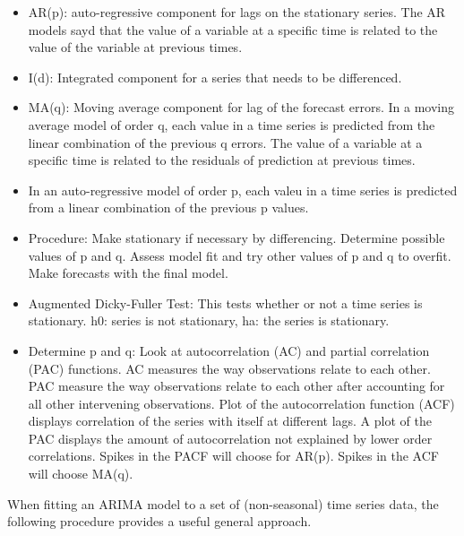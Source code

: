 \documentclass[]{book}
\begin{document}
\begin{itemize}
\item
  AR(p): auto-regressive component for lags on the stationary series. The AR models sayd that the value of a variable at a specific time is related to the value of the variable at previous times.
\item
  I(d): Integrated component for a series that needs to be differenced.
\item
  MA(q): Moving average component for lag of the forecast errors. In a moving average model of order q, each value in a time series is predicted from the linear combination of the previous q errors. The value of a variable at a specific time is related to the residuals of prediction at previous times.
\item
  In an auto-regressive model of order p, each valeu in a time series is predicted from a linear combination of the previous p values.
\item
  Procedure: Make stationary if necessary by differencing. Determine possible values of p and q. Assess model fit and try other values of p and q to overfit. Make forecasts with the final model.
\item
  Augmented Dicky-Fuller Test: This tests whether or not a time series is stationary. h0: series is not stationary, ha: the series is stationary.
\item
  Determine p and q: Look at autocorrelation (AC) and partial correlation (PAC) functions. AC measures the way observations relate to each other. PAC measure the way observations relate to each other after accounting for all other intervening observations. Plot of the autocorrelation function (ACF) displays correlation of the series with itself at different lags. A plot of the PAC displays the amount of autocorrelation not explained by lower order correlations. Spikes in the PACF will choose for AR(p). Spikes in the ACF will choose MA(q).
\end{itemize}

When fitting an ARIMA model to a set of (non-seasonal) time series data, the following procedure provides a useful general approach.
\end{document}
